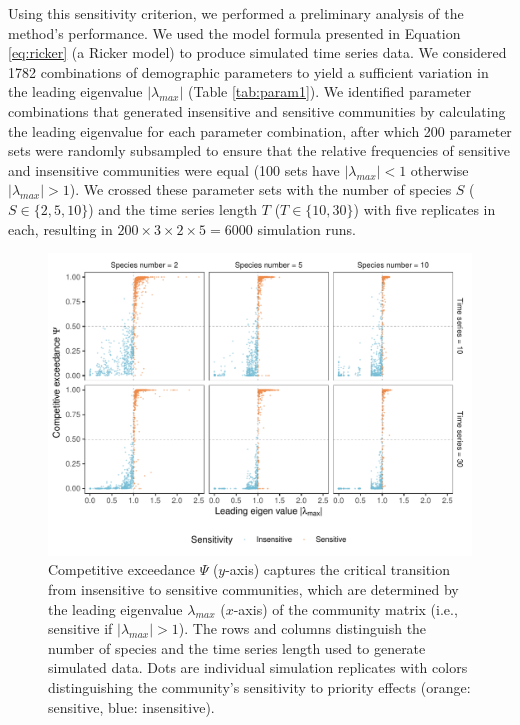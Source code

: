 \documentclass[12pt, class=article, crop=false]{standalone}
\begin{document}
Using this sensitivity criterion, we performed a preliminary analysis of the method's performance.
We used the model formula presented in Equation \ref{eq:ricker} (a Ricker model) to produce simulated time series data.
We considered 1782 combinations of demographic parameters to yield a sufficient variation in the leading eigenvalue $|\lambda_{max}|$ (Table \ref{tab:param1}).
We identified parameter combinations that generated insensitive and sensitive communities by calculating the leading eigenvalue for each parameter combination, after which 200 parameter sets were randomly subsampled to ensure that the relative frequencies of sensitive and insensitive communities were equal (100 sets have $|\lambda_{max}| < 1$ otherwise $|\lambda_{max}| > 1$).
We crossed these parameter sets with the number of species $S$ ($S \in \{2, 5, 10\}$) and the time series length $T$ ($T \in \{10, 30\}$) with five replicates in each, resulting in $200 \times 3 \times 2 \times 5 = 6000$ simulation runs.

\begin{figure}%
    \centering
    \includegraphics[scale=0.7]{output/figure_eigen_scatter.pdf}
    \caption{Competitive exceedance $\Psi$ ($y$-axis) captures the critical transition from insensitive to sensitive communities, which are determined by the leading eigenvalue $\lambda_{max}$ ($x$-axis) of the community matrix (i.e., sensitive if $|\lambda_{max}| > 1$).
    The rows and columns distinguish the number of species and the time series length used to generate simulated data.
    Dots are individual simulation replicates with colors distinguishing the community's sensitivity to priority effects (orange: sensitive, blue: insensitive).}
    \label{fig:box}
\end{figure}
\end{document}
